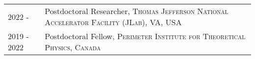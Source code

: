 \vspace*{-1.6cm}
\begin{longtable}{R{2.5cm}|p{14.8cm}}
	2022 -  & Postdoctoral Researcher, \textsc{Thomas Jefferson National Accelerator Facility (JLab), VA, USA} \\
 	2019 - 2022 & Postdoctoral Fellow, \textsc{Perimeter Institute for Theoretical Physics, Canada} \\
\end{longtable}
